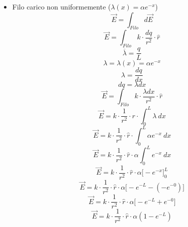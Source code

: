 \documentclass[twoside]{article}
\begin{document}
\begin{itemize}
    \item Filo carico non uniformemente ($\lambda(x) = \alpha e^{-x}$)\\
          \begin{equation*}
              \vec{E} = \displaystyle \int_{Filo} d \vec{E}
          \end{equation*}
          \begin{equation*}
              \vec{E} = \displaystyle \int_{Filo} k \cdot \frac{dq}{r^2} \cdot \hat{r}
          \end{equation*}
          \begin{equation*}
              \overline{\lambda} = \displaystyle \frac{q}{L}
          \end{equation*}
          \begin{equation*}
              \lambda = \lambda(x) = \alpha e^{-x}
          \end{equation*}
          \begin{equation*}
              \lambda = \displaystyle \frac{dq}{dx}
          \end{equation*}
          \begin{equation*}
              dq = \lambda dx
          \end{equation*}
          \begin{equation*}
              \vec{E} = \displaystyle \int_{Filo} k \cdot \frac{\lambda dx}{r^2} \cdot \hat{r}
          \end{equation*}
          \begin{equation*}
              \vec{E} = \displaystyle k \cdot \frac{1}{r^2} \cdot \hat{r} \cdot \int_{0}^{L} \lambda\ dx
          \end{equation*}
          \begin{equation*}
              \vec{E} = \displaystyle k \cdot \frac{1}{r^2} \cdot \hat{r} \cdot \int_{0}^{L} \alpha e^{-x}\ dx
          \end{equation*}
          \begin{equation*}
              \vec{E} = \displaystyle k \cdot \frac{1}{r^2} \cdot \hat{r} \cdot \alpha \int_{0}^{L} e^{-x}\ dx
          \end{equation*}
          \begin{equation*}
              \vec{E} = \displaystyle k \cdot \frac{1}{r^2} \cdot \hat{r} \cdot \alpha \bigg[ -e^{-x} \bigg]_0^L
          \end{equation*}
          \begin{equation*}
              \vec{E} = \displaystyle k \cdot \frac{1}{r^2} \cdot \hat{r} \cdot \alpha \bigg[ -e^{-L} - (-e^{-0}) \bigg]
          \end{equation*}
          \begin{equation*}
              \vec{E} = \displaystyle k \cdot \frac{1}{r^2} \cdot \hat{r} \cdot \alpha \bigg[ -e^{-L} + e^{-0} \bigg]
          \end{equation*}
          \begin{equation*}
              \vec{E} = \displaystyle k \cdot \frac{1}{r^2} \cdot \hat{r} \cdot \alpha \left(1 - e^{-L}\right)
          \end{equation*}
\end{itemize}
\end{document}
